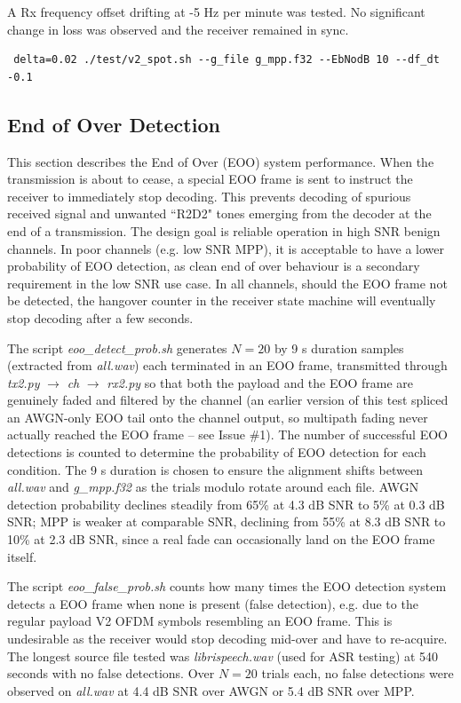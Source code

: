\documentclass{article}
\begin{document}
A Rx frequency offset drifting at -5 \si{Hz} per minute was tested. No significant change in loss was observed and the receiver remained in sync.

\begin{verbatim}
 delta=0.02 ./test/v2_spot.sh --g_file g_mpp.f32 --EbNodB 10 --df_dt -0.1
\end{verbatim}

\subsection{End of Over Detection}

This section describes the End of Over (EOO) system performance.  When the transmission is about to cease, a special EOO frame is sent to instruct the receiver to immediately stop decoding.  This prevents decoding of spurious received signal and unwanted ``R2D2" tones emerging from the decoder at the end of a transmission.  The design goal is reliable operation in high SNR benign channels.  In poor channels (e.g. low SNR MPP), it is acceptable to have a lower probability of EOO detection, as clean end of over behaviour is a secondary requirement in the low SNR use case.  In all channels, should the EOO frame not be detected, the hangover counter in the receiver state machine will eventually stop decoding after a few seconds.

The script \emph{eoo\_detect\_prob.sh} generates $N=20$ by 9 \si{s} duration samples (extracted from \emph{all.wav}) each terminated in an EOO frame, transmitted through \emph{tx2.py} $\to$ \emph{ch} $\to$ \emph{rx2.py} so that both the payload and the EOO frame are genuinely faded and filtered by the channel (an earlier version of this test spliced an AWGN-only EOO tail onto the channel output, so multipath fading never actually reached the EOO frame -- see Issue \#1). The number of successful EOO detections is counted to determine the probability of EOO detection for each condition. The 9 \si{s} duration is chosen to ensure the alignment shifts between \emph{all.wav} and \emph{g\_mpp.f32} as the trials modulo rotate around each file. AWGN detection probability declines steadily from 65\% at 4.3 \si{dB} SNR to 5\% at 0.3 \si{dB} SNR; MPP is weaker at comparable SNR, declining from 55\% at 8.3 \si{dB} SNR to 10\% at 2.3 \si{dB} SNR, since a real fade can occasionally land on the EOO frame itself.



The script \emph{eoo\_false\_prob.sh} counts how many times the EOO detection system detects a EOO frame when none is present (false detection), e.g. due to the regular payload V2 OFDM symbols resembling an EOO frame. This is undesirable as the receiver would stop decoding mid-over and have to re-acquire. The longest source file tested was \emph{librispeech.wav} (used for ASR testing) at 540 seconds with no false detections.  Over $N=20$ trials each, no false detections were observed on \emph{all.wav} at 4.4 \si{dB} SNR over AWGN or 5.4 \si{dB} SNR over MPP.
\end{document}

